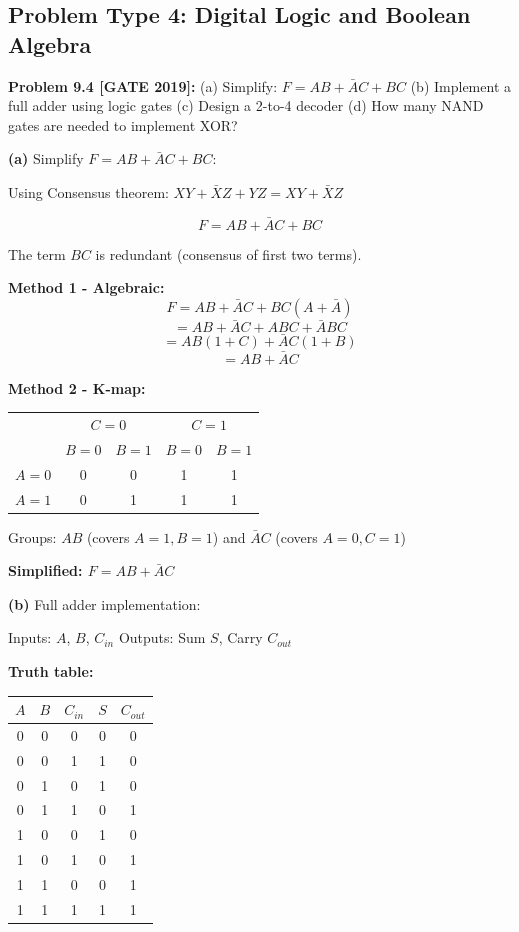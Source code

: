 \documentclass[12pt,a4paper]{article}
\begin{document}
\subsection{Problem Type 4: Digital Logic and Boolean Algebra}

\textbf{Problem 9.4 [GATE 2019]:} 
(a) Simplify: $F = AB + \bar{A}C + BC$
(b) Implement a full adder using logic gates
(c) Design a 2-to-4 decoder
(d) How many NAND gates are needed to implement XOR?

\begin{solution}
\textbf{(a)} Simplify $F = AB + \bar{A}C + BC$:

Using Consensus theorem: $XY + \bar{X}Z + YZ = XY + \bar{X}Z$

$$F = AB + \bar{A}C + BC$$

The term $BC$ is redundant (consensus of first two terms).

\textbf{Method 1 - Algebraic:}
$$F = AB + \bar{A}C + BC(A + \bar{A})$$
$$= AB + \bar{A}C + ABC + \bar{A}BC$$
$$= AB(1 + C) + \bar{A}C(1 + B)$$
$$= AB + \bar{A}C$$

\textbf{Method 2 - K-map:}

\begin{tabular}{c|cc|cc|}
& \multicolumn{2}{c|}{$C=0$} & \multicolumn{2}{c|}{$C=1$} \\
& $B=0$ & $B=1$ & $B=0$ & $B=1$ \\
\hline
$A=0$ & 0 & 0 & 1 & 1 \\
$A=1$ & 0 & 1 & 1 & 1 \\
\hline
\end{tabular}

Groups: $AB$ (covers $A=1, B=1$) and $\bar{A}C$ (covers $A=0, C=1$)

\textbf{Simplified: $F = AB + \bar{A}C$}

\textbf{(b)} Full adder implementation:

Inputs: $A$, $B$, $C_{in}$
Outputs: Sum $S$, Carry $C_{out}$

\textbf{Truth table:}
\begin{tabular}{ccc|cc}
$A$ & $B$ & $C_{in}$ & $S$ & $C_{out}$ \\
\hline
0 & 0 & 0 & 0 & 0 \\
0 & 0 & 1 & 1 & 0 \\
0 & 1 & 0 & 1 & 0 \\
0 & 1 & 1 & 0 & 1 \\
1 & 0 & 0 & 1 & 0 \\
1 & 0 & 1 & 0 & 1 \\
1 & 1 & 0 & 0 & 1 \\
1 & 1 & 1 & 1 & 1 \\
\end{tabular}


\end{solution}
\end{document}
